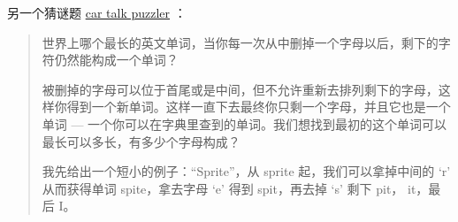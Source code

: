 \begin{exercise}


另一个猜谜题 \href{http://www.cartalk.com/content/puzzlers}{car talk puzzler} ：

\begin{quote}
世界上哪个最长的英文单词，当你每一次从中删掉一个字母以后，剩下的字符仍然能构成一个单词？

被删掉的字母可以位于首尾或是中间，但不允许重新去排列剩下的字母，这样你得到一个新单词。这样一直下去最终你只剩一个字母，并且它也是一个单词 --- 一个你可以在字典里查到的单词。我们想找到最初的这个单词可以最长可以多长，有多少个字母构成？

我先给出一个短小的例子：``Sprite''，从 sprite 起，我们可以拿掉中间的 `r' 从而获得单词 spite，拿去字母 `e' 得到 spit，再去掉 `s' 剩下 pit， it，最后 I。
\end{quote}

 



\end{exercise}
